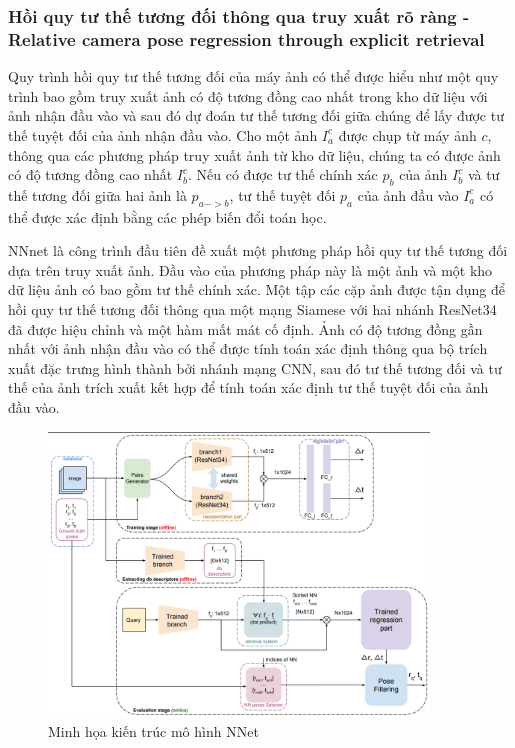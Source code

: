 \subsubsection*{Hồi quy tư thế tương đối thông qua truy xuất rõ ràng - Relative camera pose regression through explicit retrieval}
Quy trình hồi quy tư thế tương đối của máy ảnh có thể được hiểu như một quy trình bao gồm truy xuất ảnh có độ tương đồng cao nhất trong kho dữ liệu với ảnh nhận đầu vào và sau đó dự đoán tư thế tương đối giữa chúng để lấy được tư thế tuyệt đối của ảnh nhận đầu vào. Cho một ảnh $I_a^c$ được chụp từ máy ảnh $c$, thông qua các phương pháp truy xuất ảnh từ kho dữ liệu, chúng ta có được ảnh có độ tương đồng cao nhất $I_b^c$. Nếu có được tư thế chính xác $p_b$ của ảnh $I_b^c$ và tư thế tương đối giữa hai ảnh là $p_{a->b}$, tư thế tuyệt đối $p_a$ của ảnh đầu vào $I_a^c$ có thể được xác định bằng các phép biến đổi toán học.

NNnet \cite{laskar2017camera} là công trình đầu tiên đề xuất một phương pháp hồi quy tư thế tương đối dựa trên truy xuất ảnh. Đầu vào của phương pháp này là một ảnh và một kho dữ liệu ảnh có bao gồm tư thế chính xác. Một tập các cặp ảnh được tận dụng để hồi quy tư thế tương đối thông qua một mạng Siamese với hai nhánh ResNet34 đã được hiệu chỉnh và một hàm mất mát cố định. Ảnh có độ tương đồng gần nhất với ảnh nhận đầu vào có thể được tính toán xác định thông qua bộ trích xuất đặc trưng hình thành bởi nhánh mạng CNN, sau đó tư thế tương đối và tư thế của ảnh trích xuất kết hợp để tính toán xác định tư thế tuyệt đối của ảnh đầu vào.
\begin{figure}[H]
    \centering
    \includegraphics[width=0.9\textwidth]{pics/Chapter2/nnet.png}
    \caption{Minh họa kiến trúc mô hình NNet \cite{laskar2017camera}}
\end{figure}

